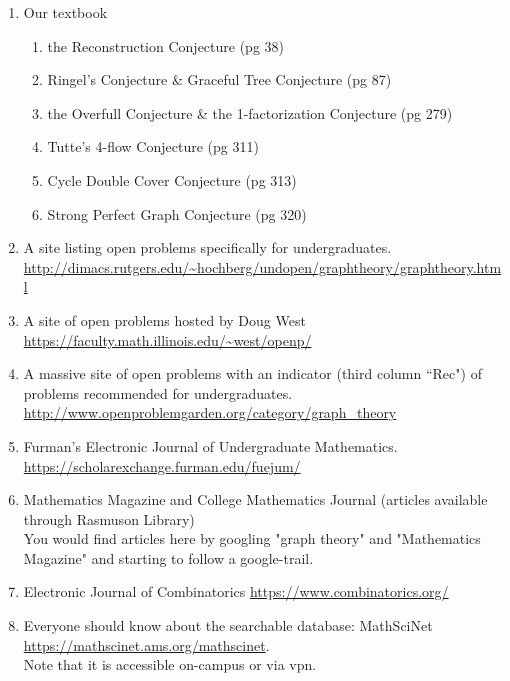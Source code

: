 \documentclass{amsart}
\begin{document}
\thispagestyle{fancy}

\begin{enumerate}
\item Our textbook
	\begin{enumerate}
	\item the Reconstruction Conjecture (pg 38)
	\item Ringel's Conjecture \& Graceful Tree Conjecture (pg 87)
	\item the Overfull Conjecture \& the 1-factorization Conjecture (pg 279)
	\item Tutte's 4-flow Conjecture (pg 311)
	\item Cycle Double Cover Conjecture (pg 313)
	\item Strong Perfect Graph Conjecture (pg 320)\\
	\end{enumerate}

\item A site listing open problems specifically for undergraduates. \url{http://dimacs.rutgers.edu/~hochberg/undopen/graphtheory/graphtheory.html}\\

\item A site of open problems hosted by Doug West \url{https://faculty.math.illinois.edu/~west/openp/}\\

\item A massive site of open problems with an indicator (third column ``Rec") of problems recommended for undergraduates. \url{http://www.openproblemgarden.org/category/graph_theory}\\

\item Furman's Electronic Journal of Undergraduate Mathematics. \url{https://scholarexchange.furman.edu/fuejum/}\\

\item Mathematics Magazine and College Mathematics Journal (articles available through Rasmuson Library)\\

You would find articles here by googling "graph theory" and "Mathematics Magazine" and starting to follow a google-trail.\\

\item Electronic Journal of Combinatorics \url{https://www.combinatorics.org/}\\

\item Everyone should know about the searchable database: MathSciNet \url{https://mathscinet.ams.org/mathscinet}.\\
Note that it is accessible on-campus or via vpn.
\end{enumerate} 
\end{document}
